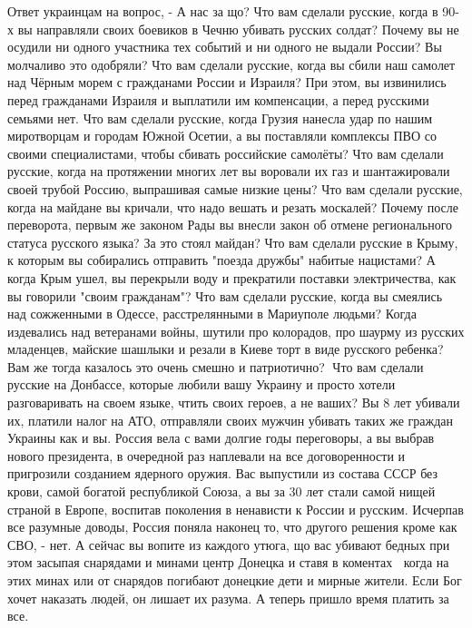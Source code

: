 Ответ украинцам на вопрос, - А нас за що?
Что вам сделали русские, когда в 90-х вы направляли своих боевиков в Чечню убивать русских солдат? Почему вы не осудили ни одного участника тех событий и ни одного не выдали России? Вы молчаливо это одобряли?
Что вам сделали русские, когда вы сбили наш самолет над Чёрным морем с гражданами России и Израиля? При этом, вы извинились перед гражданами Израиля и выплатили им компенсации, а перед русскими семьями нет.
Что вам сделали русские, когда Грузия нанесла удар по нашим миротворцам и городам Южной Осетии, а вы поставляли комплексы ПВО со своими специалистами, чтобы сбивать российские самолёты?
Что вам сделали русские, когда на протяжении многих лет вы воровали их газ и шантажировали своей трубой Россию, выпрашивая самые низкие цены?
Что вам сделали русские, когда на майдане вы кричали, что надо вешать и резать москалей?
Почему после переворота, первым же законом Рады вы внесли закон об отмене регионального статуса русского языка? За это стоял майдан?
Что вам сделали русские в Крыму, к которым вы собирались отправить "поезда дружбы" набитые нацистами? А когда Крым ушел, вы перекрыли воду и прекратили поставки электричества, как вы говорили "своим гражданам"?
Что вам сделали русские, когда вы смеялись над сожженными в Одессе, расстрелянными в Мариуполе людьми? Когда издевались над ветеранами войны, шутили про колорадов, про шаурму из русских младенцев, майские шашлыки и резали в Киеве торт в виде русского ребенка? Вам же тогда казалось это очень смешно и патриотично?🤦
Что вам сделали русские на Донбассе, которые любили вашу Украину и просто хотели разговаривать на своем языке, чтить своих героев, а не ваших? Вы 8 лет убивали их, платили налог на АТО, отправляли своих мужчин убивать таких же граждан Украины как и вы. Россия вела с вами долгие годы переговоры, а вы выбрав нового президента, в очередной раз наплевали на все договоренности и пригрозили созданием ядерного оружия.
Вас выпустили из состава СССР без крови, самой богатой республикой Союза, а вы за 30 лет стали самой нищей страной в Европе, воспитав поколения в ненависти к России и русским. Исчерпав все разумные доводы, Россия поняла наконец то, что другого решения кроме как СВО, - нет.
А сейчас вы вопите из каждого утюга, що вас убивают бедных при этом засыпая снарядами и минами центр Донецка и ставя в коментах👍🏻 когда на этих минах или от снарядов погибают донецкие дети и мирные жители.
Если Бог хочет наказать людей, он лишает их разума.
А теперь пришло время платить за все.
